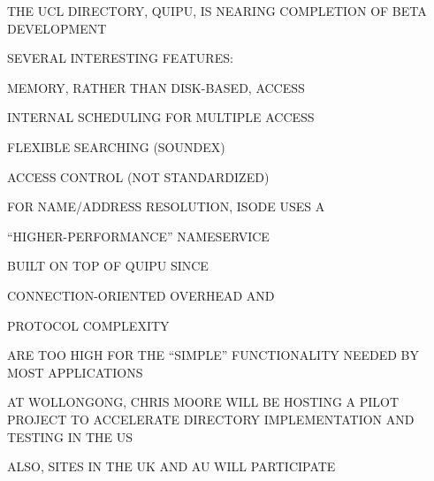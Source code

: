 \begin{bwslide}

\begin{nrtc}
\item	THE UCL DIRECTORY, QUIPU, IS NEARING COMPLETION OF BETA DEVELOPMENT

\item	SEVERAL INTERESTING FEATURES:
    \begin{nrtc}
    \item	MEMORY, RATHER THAN DISK-BASED, ACCESS

    \item	INTERNAL SCHEDULING FOR MULTIPLE ACCESS

    \item	FLEXIBLE SEARCHING (SOUNDEX)

    \item	ACCESS CONTROL (NOT STANDARDIZED)
    \end{nrtc}
\end{nrtc}
\end{bwslide}


\begin{bwslide}

\begin{nrtc}
\item	FOR NAME/ADDRESS RESOLUTION, ISODE USES A 
    \begin{nrtc}
    \item	``HIGHER-PERFORMANCE'' NAMESERVICE
    \end{nrtc}
    BUILT ON TOP OF QUIPU SINCE
    \begin{nrtc}
    \item	CONNECTION-ORIENTED OVERHEAD AND

    \item	PROTOCOL COMPLEXITY
    \end{nrtc}
    ARE TOO HIGH FOR THE ``SIMPLE'' FUNCTIONALITY NEEDED BY MOST APPLICATIONS

\item	AT WOLLONGONG, CHRIS MOORE WILL BE HOSTING A PILOT PROJECT TO
	ACCELERATE DIRECTORY IMPLEMENTATION AND TESTING IN THE US
    \begin{nrtc}
    \item	ALSO, SITES IN THE UK AND AU WILL PARTICIPATE
    \end{nrtc}
\end{nrtc}
\end{bwslide}


